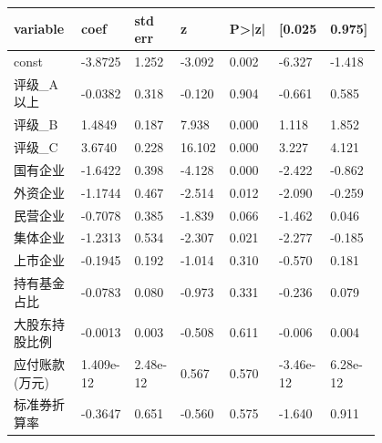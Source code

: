 \begin{table}
	\caption{稳健性检验结果}
	\begin{longtable}{p{0.18\linewidth}p{0.1\linewidth}p{0.1\linewidth}p{0.1\linewidth}p{0.1\linewidth}p{0.12\linewidth}p{0.1\linewidth}}
		\hline
		\textbf{variable} & \textbf{coef} & \textbf{std err} & \textbf{z} & \textbf{P>|z|} & \textbf{[0.025} & \textbf{0.975]} \\ \hline
		\hline
		const             & -3.8725       & 1.252            & -3.092     & 0.002          & -6.327          & -1.418          \\ \hline
		评级\_A以上       & -0.0382       & 0.318            & -0.120     & 0.904          & -0.661          & 0.585           \\ \hline
		评级\_B           & 1.4849        & 0.187            & 7.938      & 0.000          & 1.118           & 1.852           \\ \hline
		评级\_C           & 3.6740        & 0.228            & 16.102     & 0.000          & 3.227           & 4.121           \\ \hline
		国有企业          & -1.6422       & 0.398            & -4.128     & 0.000          & -2.422          & -0.862          \\ \hline
		外资企业          & -1.1744       & 0.467            & -2.514     & 0.012          & -2.090          & -0.259          \\ \hline
		民营企业          & -0.7078       & 0.385            & -1.839     & 0.066          & -1.462          & 0.046           \\ \hline
		集体企业          & -1.2313       & 0.534            & -2.307     & 0.021          & -2.277          & -0.185          \\ \hline
		上市企业          & -0.1945       & 0.192            & -1.014     & 0.310          & -0.570          & 0.181           \\ \hline
		持有基金占比      & -0.0783       & 0.080            & -0.973     & 0.331          & -0.236          & 0.079           \\ \hline
		大股东持股比例    & -0.0013       & 0.003            & -0.508     & 0.611          & -0.006          & 0.004           \\ \hline
		应付账款(万元)    & 1.409e-12     & 2.48e-12         & 0.567      & 0.570          & -3.46e-12       & 6.28e-12        \\ \hline
		标准券折算率      & -0.3647       & 0.651            & -0.560     & 0.575          & -1.640          & 0.911           \\ \hline

\end{longtable}
\end{table}
